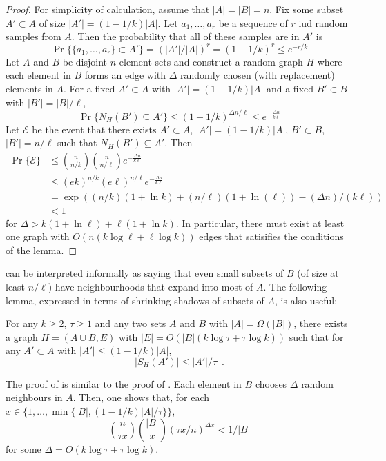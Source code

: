 \documentclass{patmorin}
\begin{document}
\begin{proof}
  For simplicity of calculation, assume that $|A|=|B|=n$.  Fix some
  subset $A'\subset A$ of size $|A'|=(1-1/k)|A|$.  Let $a_1,\ldots,a_r$
  be a sequence of $r$ iud random samples from $A$.  Then the probability
  that all of these samples are in $A'$ is
  \[
     \Pr\{\{a_1,\ldots,a_r\}\subset A'\} = (|A'|/|A|)^r = (1-1/k)^r \le e^{-r/k}
  \]
  Let $A$ and $B$ be disjoint $n$-element sets and construct a random
  graph $H$ where each element in $B$ forms an edge with $\Delta$ randomly
  chosen (with replacement) elements in $A$.  For a fixed $A'\subset A$
  with $|A'|=(1-1/k)|A|$ and a fixed $B'\subset B$ with $|B'| = |B|/\ell$,
  \[
    \Pr\{N_H(B') \subseteq A'\} 
        \le (1-1/k)^{\Delta n/\ell} 
        \le e^{-\frac{\Delta n}{k\ell}}
  \]
  Let $\mathcal{E}$ be the event that there exists $A'\subset
  A$, $|A'|=(1-1/k)|A|$, $B'\subset B$, $|B'|=n/\ell$ such that
  $N_H(B')\subseteq A'$.  Then
  \begin{align*}
    \Pr\{\mathcal{E}\} 
        & \le \binom{n}{n/k}\binom{n}{n/\ell}e^{-\frac{\Delta n}{k\ell}} \\
        & \le (ek)^{n/k} (e\ell)^{n/\ell}e^{-\frac{\Delta n}{k\ell}} \\
        & = \exp((n/k)(1+\ln k) + (n/\ell)(1+\ln(\ell)) - (\Delta n)/(k\ell)) \\
        & < 1
  \end{align*}
  for $\Delta > k(1+\ln \ell) + \ell(1+\ln k)$.  In particular, there
  must exist at least one graph with $O(n(k\log\ell + \ell\log k))$
  edges that satisifies the conditions of the lemma.
\end{proof}

 can be interpreted informally as saying that even small
subsets of $B$ (of size at least $n/\ell$) have neighbourhoods that
expand into most of $A$.  The following lemma, expressed in terms of
shrinking shadows of subsets of $A$, is also useful:

\begin{lem}
   For any $k\ge 2$, $\tau\ge 1$ and any two sets $A$ and $B$ with
   $|A|=\Omega(|B|)$, there exists a graph $H=(A\cup B,E)$ with $|E|=O(|B|(k\log
   \tau + \tau\log k))$ such that for any $A'\subset A$ with $|A'|\le
   (1-1/k)|A|$,
   \[ |S_H(A')| \le |A'|/\tau \enspace .\]
\end{lem}

The proof of  is similar to the proof of .
Each element in $B$ chooses $\Delta$ random neighbours in $A$.  Then, one shows that, for each $x\in\{1,\ldots,\min\{|B|, (1-1/k)|A|/\tau\}\}$,
\[
    \binom{n}{\tau x}\binom{|B|}{x}(\tau x/n)^{\Delta x} < 1/|B|
\]
for some $\Delta=O(k\log\tau +\tau\log k)$.
\end{document}
